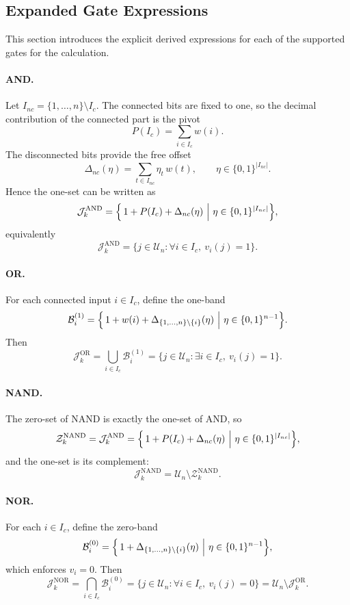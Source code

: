 \documentclass[11pt]{article}
\theoremstyle{definition}
\newcommand{\U}{\mathcal{U}_n}
\newcommand{\Ic}{I_c}
\newcommand{\J}{\mathcal{J}}
\newcommand{\bits}{\{0,1\}}
\begin{document}
\subsection{Expanded Gate Expressions}
This section introduces the explicit derived expressions 
for each of the supported gates for the calculation.

\paragraph{AND.}
Let \(I_{nc}=\{1,\dots,n\}\setminus \Ic\). The connected bits are fixed to one, so the decimal contribution of the connected part is the pivot
\[
P(\Ic)=\sum_{i\in\Ic} w(i).
\]
The disconnected bits provide the free offset
\[
\Delta_{nc}(\eta)=\sum_{t\in I_{nc}} \eta_t\,w(t), \qquad \eta\in\bits^{|I_{nc}|}.
\]
Hence the one-set can be written as
\[
\J_k^{\mathrm{AND}}
=
\Bigl\{\,1+P(\Ic)+\Delta_{nc}(\eta)\ \Big|\ \eta\in\bits^{|I_{nc}|}\Bigr\},
\]
equivalently
\[
\J_k^{\mathrm{AND}}=\{j\in\U:\forall i\in\Ic,\ v_i(j)=1\}.
\]

\paragraph{OR.}
For each connected input \(i\in\Ic\), define the one-band
\[
\mathcal{B}_i^{(1)}
=
\Bigl\{\,1+w(i)+\Delta_{\{1,\dots,n\}\setminus\{i\}}(\eta)\ \Big|\
\eta\in\bits^{n-1}\Bigr\}.
\]
Then
\[
\J_k^{\mathrm{OR}}=\bigcup_{i\in\Ic}\mathcal{B}_i^{(1)}
=
\{j\in\U:\exists i\in\Ic,\ v_i(j)=1\}.
\]

\paragraph{NAND.}
The zero-set of NAND is exactly the one-set of AND, so
\[
\mathcal{Z}_k^{\mathrm{NAND}}
=
\J_k^{\mathrm{AND}}
=
\Bigl\{\,1+P(\Ic)+\Delta_{nc}(\eta)\ \Big|\ \eta\in\bits^{|I_{nc}|}\Bigr\},
\]
and the one-set is its complement:
\[
\J_k^{\mathrm{NAND}}=\U\setminus \mathcal{Z}_k^{\mathrm{NAND}}.
\]

\paragraph{NOR.}
For each \(i\in\Ic\), define the zero-band
\[
\mathcal{B}_i^{(0)}
=
\Bigl\{\,1+\Delta_{\{1,\dots,n\}\setminus\{i\}}(\eta)\ \Big|\
\eta\in\bits^{n-1}\Bigr\},
\]
which enforces \(v_i=0\). Then
\[
\J_k^{\mathrm{NOR}}=\bigcap_{i\in\Ic}\mathcal{B}_i^{(0)}
=
\{j\in\U:\forall i\in\Ic,\ v_i(j)=0\}
=
\U\setminus\J_k^{\mathrm{OR}}.
\]
\end{document}

